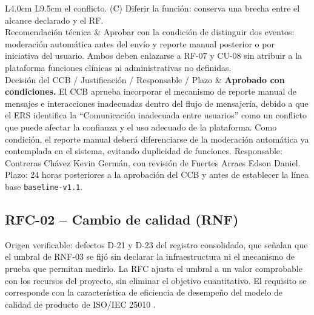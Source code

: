 \documentclass[journal,onecolumn]{IEEEtran}
\begin{document}
\begin{longtable}{L{4.0cm} L{9.5cm}}
		el conflicto.
		(C) Diferir la función: conserva una brecha entre el alcance declarado y el RF. \\
		\addlinespace
		Recomendación técnica &
		Aprobar con la condición de distinguir dos eventos: moderación automática antes del envío y
		reporte manual posterior o por iniciativa del usuario. Ambos deben enlazarse a RF-07 y CU-08
		sin atribuir a la plataforma funciones clínicas ni administrativas no definidas. \\
		\addlinespace
		Decisión del CCB / Justificación / Responsable / Plazo &
		\textbf{Aprobado con condiciones.} El CCB aprueba incorporar el mecanismo de reporte manual de
		mensajes e interacciones inadecuadas dentro del flujo de mensajería, debido a que el ERS
		identifica la ``Comunicación inadecuada entre usuarios'' como un conflicto que puede afectar
		la confianza y el uso adecuado de la plataforma. Como condición, el reporte manual deberá
		diferenciarse de la moderación automática ya contemplada en el sistema, evitando duplicidad de
		funciones. Responsable: Contreras Chávez Kevin Germán, con revisión de Fuertes Arraes Edson
		Daniel. Plazo: 24 horas posteriores a la aprobación del CCB y antes de establecer la línea
		base \texttt{baseline-v1.1}. \\
	\end{longtable}
	
	\subsection{RFC-02 -- Cambio de calidad (RNF)}
	
	Origen verificable: defectos D-21 y D-23 del registro consolidado, que señalan que el umbral de
	RNF-03 se fijó sin declarar la infraestructura ni el mecanismo de prueba que permitan medirlo. La
	RFC ajusta el umbral a un valor comprobable con los recursos del proyecto, sin eliminar el
	objetivo cuantitativo. El requisito se corresponde con la característica de eficiencia de
	desempeño del modelo de calidad de producto de ISO/IEC 25010 \cite{iso25010}.
	
\end{document}
